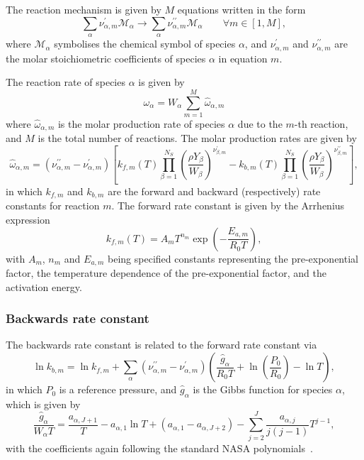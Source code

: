 \documentclass[notitlepage]{revtex4-1}
\begin{document}
The reaction mechanism is given by $M$ equations written in the form
\begin{equation}\displaystyle\sum_{\alpha}\nu_{\alpha,m}^{\prime}\mathcal{M}_{\alpha}\rightarrow\displaystyle\sum_{\alpha}\nu_{\alpha,m}^{\prime\prime}\mathcal{M}_{\alpha}\qquad\forall{m}\in\left[1,M\right],\end{equation}
where $\mathcal{M}_{\alpha}$ symbolises the chemical symbol of species $\alpha$, and 
$\nu_{\alpha,m}^{\prime}$ and $\nu_{\alpha,m}^{\prime\prime}$ are the molar stoichiometric coefficients of species $\alpha$ in equation $m$.

The reaction rate of species $\alpha$ is given by
\begin{equation}\omega_{\alpha}=W_{\alpha}\displaystyle\sum_{m=1}^{M}\hat{\omega}_{\alpha,m}\end{equation}
where $\hat{\omega}_{\alpha,m}$ is the molar production rate of species $\alpha$ due to the $m$-th reaction, and $M$ is the total number of reactions. The molar production rates are given by
\begin{equation}\hat{\omega}_{\alpha,m}=\left(\nu^{\prime\prime}_{\alpha,m}-\nu^{\prime}_{\alpha,m}\right)\left[k_{f,m}\left(T\right)\displaystyle\prod_{\beta=1}^{N_{S}}\left(\frac{\rho{Y}_{\beta}}{W_{\beta}}\right)^{\nu^{\prime}_{\beta,m}}-k_{b,m}\left(T\right)\displaystyle\prod_{\beta=1}^{N_{S}}\left(\frac{\rho{Y}_{\beta}}{W_{\beta}}\right)^{\nu^{\prime\prime}_{\beta,m}}\right],\end{equation}
in which $k_{f,m}$ and $k_{b,m}$ are the forward and backward (respectively) rate constants for reaction $m$. The forward rate constant is given by the Arrhenius expression
\begin{equation}k_{f,m}\left(T\right)=A_{m}T^{n_{m}}\exp\left(-\frac{E_{a,m}}{R_{0}T}\right),\end{equation}
with $A_{m}$, $n_{m}$ and $E_{a,m}$ being specified constants representing the pre-exponential factor, the temperature dependence of the pre-exponential factor, and the activation energy.

\subsubsection{Backwards rate constant}

The backwards rate constant is related to the forward rate constant via
\begin{equation}\ln{k}_{b,m}=\ln{k}_{f,m} + \displaystyle\sum_{\alpha}\left(\nu^{\prime\prime}_{\alpha,m}-\nu^{\prime}_{\alpha,m}\right)\left(\frac{\hat{g}_{\alpha}}{R_{0}T}+\ln\left(\frac{P_{0}}{R_{0}}\right)-\ln{T}\right),\end{equation}
in which $P_{0}$ is a reference pressure, and $\hat{g}_{\alpha}$ is the Gibbs function for species $\alpha$, which is given by
\begin{equation}\frac{\hat{g}_{\alpha}}{W_{\alpha}T}=\frac{a_{\alpha,J+1}}{T}-a_{\alpha,1}\ln{T}+\left(a_{\alpha,1}-a_{\alpha,J+2}\right)-\displaystyle\sum_{j=2}^{J}\frac{a_{\alpha,j}}{j\left(j-1\right)}T^{j-1},\end{equation}
with the coefficients again following the standard NASA polynomials~\cite{gordon_1971}.
\end{document}
